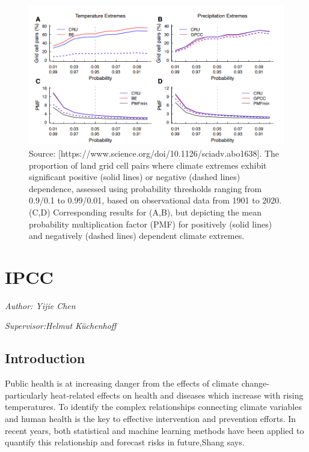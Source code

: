 \documentclass[
]{krantz}
\begin{document}
\vspace{1em}
\begin{figure}

{\centering \includegraphics[width=0.8\linewidth]{work/06-anthropo/figures/sensitivity} 

}

\caption{Source: [https://www.science.org/doi/10.1126/sciadv.abo1638]. The proportion of land grid cell pairs where climate extremes exhibit significant positive (solid lines) or negative (dashed lines) dependence, assessed using probability thresholds ranging from 0.9/0.1 to 0.99/0.01, based on observational data from 1901 to 2020. (C,D) Corresponding results for (A,B), but depicting the mean probability multiplication factor (PMF) for positively (solid lines) and negatively (dashed lines) dependent climate extremes.}\label{fig:unnamed-chunk-10}
\end{figure}
\vspace{1em}

\chapter{IPCC}\label{ipcc}

\emph{Author: Yijie Chen}

\emph{Supervisor:Helmut Küchenhoff}

\section{Introduction}\label{introduction-3}

Public health is at increasing danger from the effects of climate change-particularly heat-related effects on health and diseases which increase with rising temperatures. To identify the complex relationships connecting climate variables and human health is the key to effective intervention and prevention efforts. In recent years, both statistical and machine learning methods have been applied to quantify this relationship and forecast risks in future,Shang says.
\end{document}
